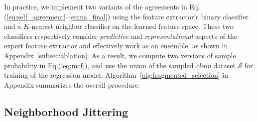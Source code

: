 \documentclass{article}
\theoremstyle{plain}
\theoremstyle{definition}
\theoremstyle{remark}
\begin{document}
In practice, we implement two variants of the agreements in Eq.(\ref{eq:self_agreement}--\ref{eq:na_final}) using the feature extractor's binary classifier and a $K$-nearest neighbor classifier on the learned feature space.
These two classifiers respectively consider \textit{predictive} and \textit{representational} aspects of the expert feature extractor and effectively work as an ensemble, as shown in Appendix~\ref{subsec:ablation}.
As a result, we compute two versions of sample probability in Eq.(\ref{eq:mcf}), and use the union of the sampled \textit{clean} dataset $\mathcal{S}$ for training of the regression model. 
Algorithm~\ref{alg:fragmented_selection} in Appendix summarizes the overall procedure.


\subsection{Neighborhood Jittering}\label{sec:jittering}
\end{document}
